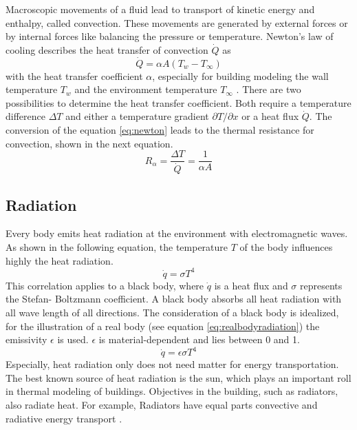     Macroscopic movements of a fluid  lead to transport of kinetic energy and enthalpy, called convection. These movements are generated by external forces or by internal forces like balancing the pressure or temperature.\cite{.2013}
    \newline
    Newton's law of cooling describes the heat transfer of convection $\dot{Q}$ as 
    \begin{equation}
    \label{eq:newton}
        \dot{Q} = \alpha A (T_w - T_\infty)
    \end{equation}
    with the heat transfer coefficient $\alpha$, especially for building modeling the wall temperature $T_w$ and the environment temperature $T_\infty$ \cite{Griesinger.2019}
    . There are two possibilities to determine the heat transfer coefficient. Both require a temperature difference $\Delta T$ and either a temperature gradient $\partial T/\partial x$ or a heat flux $\dot{Q}$.
    \cite{.2013} 
    \newline
    The conversion of the equation \ref{eq:newton} leads to the thermal resistance for convection, shown in the next equation.\cite{Griesinger.2019}
    \begin{equation}
        R_\alpha = \frac{\Delta T}{\dot{Q}} = \frac{1}{\alpha A}
    \end{equation}

\subsection{Radiation}
\label{subsection:radiation}

    Every body emits heat radiation at the environment with electromagnetic waves. As shown in the following equation, the temperature $T$ of the body influences highly the heat radiation.\cite{.2013} 
    \begin{equation}
    \label{eq:radiation}
        \dot{q} = \sigma T^4
    \end{equation}
    This correlation applies to a black body, where $\dot{q}$ is a heat flux and $\sigma$ represents the Stefan- Boltzmann coefficient. A black body absorbs all heat radiation with all wave length of all directions\cite{Griesinger.2019}. The consideration of a black body is idealized, for the illustration of a real body (see equation \ref{eq:realbodyradiation}) the emissivity $\epsilon$ is used. $\epsilon$ is material-dependent and lies between 0 and 1.
    \begin{equation}
    \label{eq:realbodyradiation}
        \dot{q} = \epsilon \sigma T^4
    \end{equation}
    Especially, heat radiation only does not need matter for energy transportation.\cite{.2013}
    \newline
    The best known source of heat radiation is the sun, which plays an important roll in thermal modeling of buildings. Objectives in the building, such as radiators, also  radiate heat. For example, Radiators have equal parts convective and radiative energy transport \cite{Hazyuk.2012}. 
    
